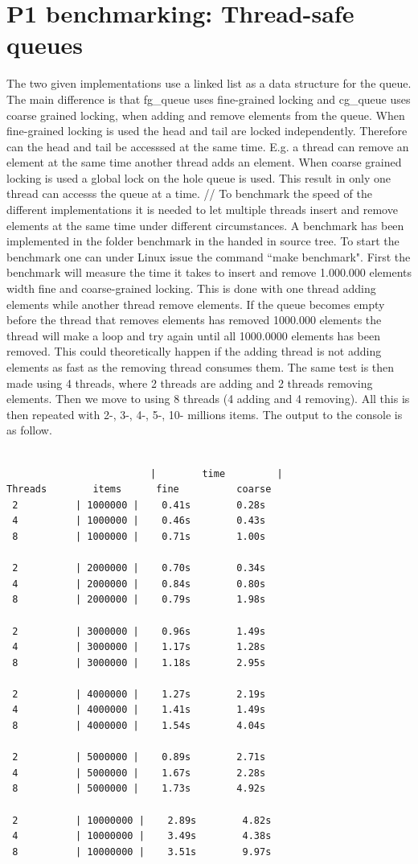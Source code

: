 \documentclass[a4paper,12pt,danish]{report}
\begin{document}
\section{P1 benchmarking: Thread-safe queues}
The two given implementations use a linked list as a
data structure for the queue. The main difference is that fg\_queue uses fine-grained locking and
cg\_queue uses coarse grained locking, when adding and remove elements from the
queue. When fine-grained locking is used the head and tail are locked
independently. Therefore can the head and tail be accesssed at the same time.
E.g. a thread can remove an element at the same time another thread adds an
element. When coarse grained locking is used a global lock on the hole queue is used.
This result in only one thread can accesss the queue at a time.
//
To benchmark the speed of the different implementations it is needed to let
multiple threads insert and remove elements at the same time under different
circumstances. A benchmark has been implemented in the folder benchmark in
the handed in source tree. To start the benchmark one can under Linux issue
the command ``make benchmark".
First the benchmark will measure the time it takes to insert and remove 1.000.000
elements width fine and coarse-grained locking. This is done with one thread
adding elements while another thread remove elements.
If the queue becomes empty before the thread that removes elements has
removed 1000.000 elements the thread will  make a loop and try again
until all 1000.0000 elements has been removed. This could theoretically happen
if the adding thread is not adding elements as fast as the removing thread
consumes them. The same test is then made using 4 threads, where 2 threads are
adding and 2 threads removing elements. Then we move to using 8 threads (4
adding and 4 removing). All this is then repeated with 2-, 3-, 4-, 5-, 10-
millions items.
The output to the console is as follow.
\begin{lstlisting}

                         |        time         |
Threads        items      fine          coarse
 2          | 1000000 |    0.41s        0.28s
 4          | 1000000 |    0.46s        0.43s
 8          | 1000000 |    0.71s        1.00s

 2          | 2000000 |    0.70s        0.34s
 4          | 2000000 |    0.84s        0.80s
 8          | 2000000 |    0.79s        1.98s

 2          | 3000000 |    0.96s        1.49s
 4          | 3000000 |    1.17s        1.28s
 8          | 3000000 |    1.18s        2.95s

 2          | 4000000 |    1.27s        2.19s
 4          | 4000000 |    1.41s        1.49s
 8          | 4000000 |    1.54s        4.04s

 2          | 5000000 |    0.89s        2.71s
 4          | 5000000 |    1.67s        2.28s
 8          | 5000000 |    1.73s        4.92s

 2          | 10000000 |    2.89s        4.82s
 4          | 10000000 |    3.49s        4.38s
 8          | 10000000 |    3.51s        9.97s

\end{lstlisting}
\end{document}
